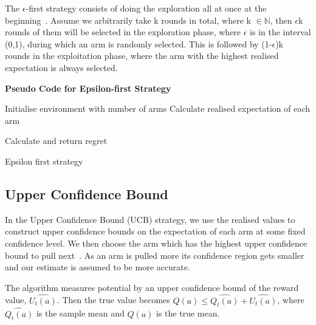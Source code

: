 The $\epsilon$-first strategy consists of doing the exploration all at once at the beginning~\citep{vermorel}.
Assume we arbitrarily take k rounds in total, where k $\in \mathbb{N}$, then $\epsilon$k rounds of them will be selected in the exploration phase, where $\epsilon$ is in the interval (0,1), during which an arm is randomly selected.
This is followed by (1-$\epsilon$)k rounds in the exploitation phase, where the arm with the highest realised expectation is always selected.
\par
\textbf{Pseudo Code for Epsilon-first Strategy}
\newline
\begin{algorithm}[H]
    Initialise environment with number of arms\;
    Calculate realised expectation of each arm\;

    Calculate and return regret
    \caption{Epsilon first strategy}\label{alg:epsilon_algorithm}
\end{algorithm}

\subsection{Upper Confidence Bound}\label{subsec:upper-confidence-bound}
In the Upper Confidence Bound (UCB) strategy, we use the realised values to construct upper confidence bounds on the expectation of each arm at some fixed confidence level.
We then choose the arm which has the highest upper confidence bound to pull next~\citep{SVGarbar2012}.
As an arm is pulled more its confidence region gets smaller and our estimate is assumed to be more accurate.
\par
The algorithm measures potential by an upper confidence bound of the reward value, $\widehat{U_t (a)}$.
Then the true value becomes $ Q(a)  \leq \widehat{Q_t (a)}+\widehat{U_t (a)} $, where  $ \widehat{Q_t (a)}$ is the sample mean and $ Q(a)$ is the true mean.

